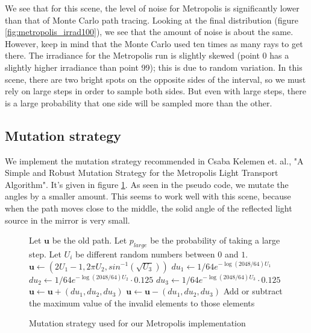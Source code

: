 \documentclass{article} %
\begin{document}
We see that for this scene, the level of noise for Metropolis is significantly lower than that of Monte Carlo path tracing. Looking at the final distribution (figure \ref{fig:metropolis_irrad100}), we see that the amount of noise is about the same. However, keep in mind that the Monte Carlo used ten times as many rays to get there. The irradiance for the Metropolis run is slightly skewed (point 0 has a slightly higher irradiance than point 99); this is due to random variation. In this scene, there are two bright spots on the opposite sides of the interval, so we must rely on large steps in order to sample both sides. But even with large steps, there is a large probability that one side will be sampled more than the other.

\subsection*{Mutation strategy}
We implement the mutation strategy recommended in Csaba Kelemen et. al., "A Simple and Robust Mutation Strategy for the Metropolis Light Transport Algorithm". It's given in figure \ref{fig:mutation_metropolis}. As seen in the pseudo code, we mutate the angles by a smaller amount. This seems to work well with this scene, because when the path moves close to the middle, the solid angle of the reflected light source in the mirror is very small.

\begin{figure}[h]
\begin{algorithmic}
\STATE Let $\mathbf{u}$ be the old path.
\STATE Let $p_{large}$ be the probability of taking a large step.
\STATE Let $U_i$ be different random numbers between $0$ and $1$. 
    \STATE $\mathbf{u} \gets \left( 2U_1-1, 2\pi U_2, sin^{-1}(\sqrt{U_3})\right)$
\ELSE
    \STATE $du_1 \gets 1/64 e^{-\log(2048/64)U_1}$
    \STATE $du_2 \gets 1/64 e^{-\log(2048/64)U_2}\cdot 0.125$
    \STATE $du_3 \gets 1/64 e^{-\log(2048/64)U_3}\cdot 0.125$
        \STATE $\mathbf{u} \gets \mathbf{u} + (du_1, du_2, du_3)$
    \ELSE
        \STATE $\mathbf{u} \gets \mathbf{u} - (du_1, du_2, du_3)$
    \ENDIF
        \STATE Add or subtract the maximum value of the invalid elements to those elements
    \ENDIF
\ENDIF
\end{algorithmic}
\caption{Mutation strategy used for our Metropolis implementation}
\label{fig:mutation_metropolis}
\end{figure}
\end{document}
